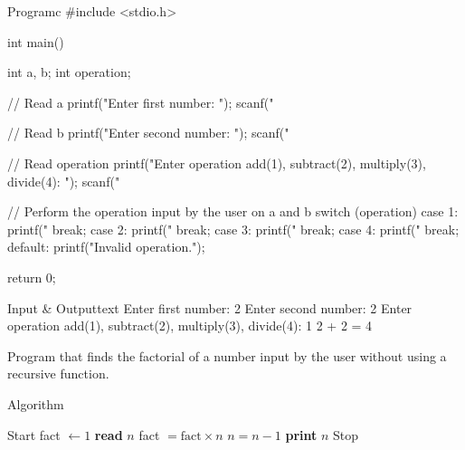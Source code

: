 \documentclass[11pt]{ipu-c}
\begin{document}
    \newpage
    \begin{code}
        {Program}{c}
#include <stdio.h>

int main() {
    int a, b;
    int operation;

    // Read a
    printf("Enter first number: ");
    scanf("%

    // Read b
    printf("Enter second number: ");
    scanf("%

    // Read operation
    printf("Enter operation add(1), subtract(2), multiply(3), divide(4): ");
    scanf("%

    // Perform the operation input by the user on a and b
    switch (operation) {
        case 1:
            printf("%
            break;
        case 2:
            printf("%
            break;
        case 3:
            printf("%
            break;
        case 4:
            printf("%
            break;
        default:
            printf("Invalid operation.");
    }

    return 0;
}
    \end{code}
    \begin{code}
        {Input \& Output}{text}
Enter first number: 2
Enter second number: 2
Enter operation add(1), subtract(2), multiply(3), divide(4): 1
2 + 2 = 4
    \end{code}


    {Program that finds the factorial of a number input by the user without using a recursive function.}

    \begin{tabularsection}{Algorithm}
        \begin{algorithmic}[1]
            \State Start
            \State fact $\gets 1$
            \State \textbf{read} $n$
                \State fact $= \text{fact} \times n$
                \State $n = n - 1$
            \EndWhile
            \State \textbf{print} $n$
            \State Stop
        \end{algorithmic}
    \end{tabularsection}
\end{document}

